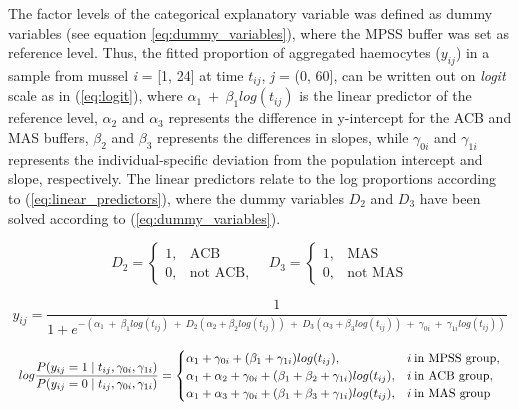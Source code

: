 The factor levels of the categorical explanatory variable was defined as dummy variables (see equation \ref{eq:dummy_variables}), where the MPSS buffer was set as reference level. Thus, the fitted proportion of aggregated haemocytes ($y_{ij}$) in a sample from mussel \emph{i} = [1, 24] at time $t_{ij}$, \emph{j} = (0, 60], can be written out on \emph{logit} scale as in (\ref{eq:logit}), where $\alpha_{1} \: + \: \beta_{1}log(t_{ij})$ is the linear predictor of the reference level, $\alpha_{2}$ and $\alpha_{3}$ represents the difference in y-intercept for the ACB and MAS buffers, $\beta_{2}$ and $\beta_{3}$ represents the differences in slopes, while $\gamma_{0i}$ and $\gamma_{1i}$ represents the individual-specific deviation from the population intercept and slope, respectively. The linear predictors relate to the log proportions according to (\ref{eq:linear_predictors}), where the dummy variables $D_{2}$ and $D_{3}$ have been solved according to (\ref{eq:dummy_variables}).

\begin{equation}
    \label{eq:dummy_variables}
D_{2} =\begin{cases}
      1, & \text{ACB}\\
      0, & \text{not ACB},
    \end{cases}
    \quad
D_{3} =\begin{cases}
      1, & \text{MAS}\\
      0, & \text{not MAS}
    \end{cases}
\end{equation}

\begin{equation}
\label{eq:logit}
y_{ij} = \dfrac{1}{1 + e^{-(\alpha_{1} \: + \: \beta_{1} log(t_{ij}) \: + \: D_{2}(\alpha_{2} + \beta_{2}log(t_{ij})) \: + \:  D_{3}(\alpha_{3} + \beta_{3}log(t_{ij})) \: + \: \gamma_{0i} \: + \: \gamma_{1i}log(t_{ij}))}}
\end{equation}

\begin{equation}
    \label{eq:linear_predictors}
    \resizebox{\linewidth}{!}{$
    log\dfrac{P(y_{ij} = 1 \mid t_{ij}, \gamma_{0i}, \gamma_{1i})}{P(y_{ij} = 0 \mid t_{ij}, \gamma_{0i}, \gamma_{1i})} = \begin{cases}
        \alpha_{1} + \gamma_{0i} + (\beta_{1} + \gamma_{1i})log(t_{ij}), & i \: \text{in MPSS group}, \\
        \alpha_{1} + \alpha_{2} + \gamma_{0i} + (\beta_{1} + \beta_{2} + \gamma_{1i})log(t_{ij}), & i \: \text{in ACB group}, \\
        \alpha_{1} + \alpha_{3} + \gamma_{0i} + (\beta_{1} + \beta_{3} + \gamma_{1i})log(t_{ij}), & i \: \text{in MAS group} \\
    \end{cases}
    $}
\end{equation}

